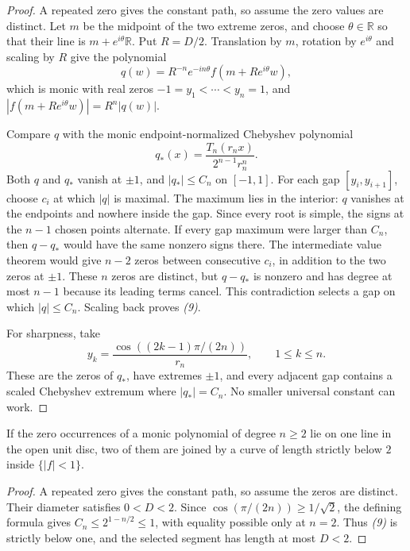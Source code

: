 \documentclass[11pt]{article}
\begin{document}
\begin{proof}
A repeated zero gives the constant path, so assume the zero values are
distinct. Let $m$ be the midpoint of the two extreme zeros, and choose
$\theta\in\mathbb R$ so that their line is $m+e^{i\theta}\mathbb R$.
Put $R=D/2$. Translation by $m$, rotation by $e^{i\theta}$ and scaling
by $R$ give the polynomial
\[
 q(w)=R^{-n}e^{-in\theta}f(m+Re^{i\theta}w),
\]
which is monic with real zeros
$-1=y_1<\cdots<y_n=1$, and
$|f(m+Re^{i\theta}w)|=R^n|q(w)|$.

Compare $q$ with the monic endpoint-normalized Chebyshev polynomial
\[
 q_*(x)=\frac{T_n(r_nx)}{2^{n-1}r_n^n}.
\]
Both $q$ and $q_*$ vanish at $\pm1$, and $|q_*|\le C_n$ on
$[-1,1]$.  For each gap $[y_i,y_{i+1}]$, choose $c_i$ at which
$|q|$ is maximal. The maximum lies in the interior: $q$ vanishes at the
endpoints and nowhere inside the gap. Since every root is simple, the
signs at the $n-1$ chosen points alternate. If every gap maximum were
larger than $C_n$, then $q-q_*$ would have the same nonzero signs there.
The intermediate value theorem would give $n-2$ zeros between consecutive
$c_i$, in addition to the two zeros at $\pm1$. These $n$ zeros are distinct,
but $q-q_*$ is nonzero and has degree at most $n-1$ because its leading
terms cancel.
This contradiction selects a gap on which $|q|\le C_n$.  Scaling back proves
\emph{(9)}.

For sharpness, take
\[
 y_k=\frac{\cos((2k-1)\pi/(2n))}{r_n},
 \qquad 1\le k\le n.
\]
These are the zeros of $q_*$, have extremes $\pm1$, and every adjacent gap
contains a scaled Chebyshev extremum where $|q_*|=C_n$.  No smaller universal
constant can work.
\end{proof}

\begin{corollary}
\label{cor:collinear-erdos-1041}
If the zero occurrences of a monic polynomial of degree $n\ge2$ lie on one line
in the open unit disc, two of them are joined by a curve of length strictly
below $2$ inside $\{|f|<1\}$.
\end{corollary}

\begin{proof}
A repeated zero gives the constant path, so assume the zeros are distinct.
Their diameter satisfies $0<D<2$. Since
$\cos(\pi/(2n))\ge1/\sqrt2$, the defining formula gives
$C_n\le2^{1-n/2}\le1$, with equality possible only at $n=2$.
Thus \emph{(9)} is strictly below one, and the selected segment has
length at most $D<2$.
\end{proof}
\end{document}
